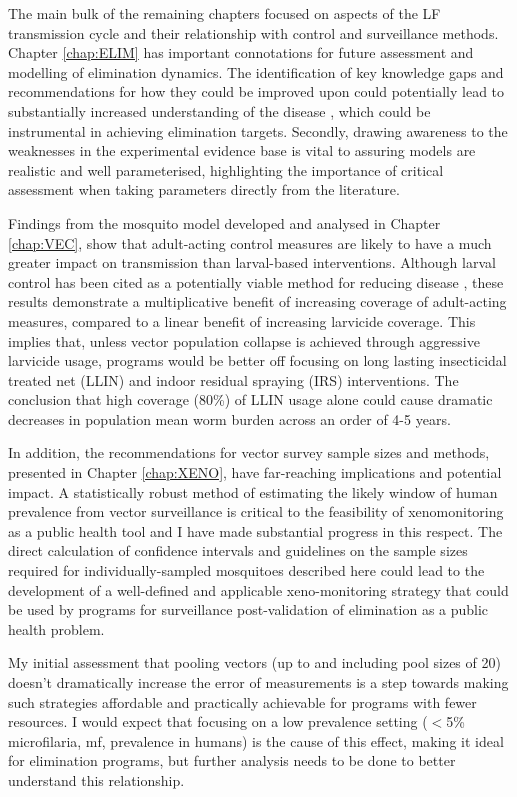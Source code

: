 The main bulk of the remaining chapters focused on aspects of the LF transmission cycle and their relationship with control and surveillance methods. Chapter \ref{chap:ELIM} has important connotations for future assessment and modelling of elimination dynamics. The identification of key knowledge gaps and recommendations for how they could be improved upon could potentially lead to substantially increased understanding of the disease \cite{Davis2019}, which could be instrumental in achieving elimination targets. Secondly, drawing awareness to the weaknesses in the experimental evidence base is vital to assuring models are realistic and well parameterised, highlighting the importance of critical assessment when taking parameters directly from the literature.

Findings from the mosquito model developed and analysed in Chapter \ref{chap:VEC}, show that adult-acting control measures are likely to have a much greater impact on transmission than larval-based interventions. Although larval control has been cited as a potentially viable method for reducing disease \cite{Kroeger1995}, these results demonstrate a multiplicative benefit of increasing coverage of adult-acting measures, compared to a linear benefit of increasing larvicide coverage. This implies that, unless vector population collapse is achieved through aggressive larvicide usage, programs would be better off focusing on long lasting insecticidal treated net (LLIN) and indoor residual spraying (IRS) interventions. The conclusion that high coverage (80\%) of LLIN usage alone could cause dramatic decreases in population mean worm burden across an order of 4-5 years. 

In addition, the recommendations for vector survey sample sizes and methods, presented in Chapter \ref{chap:XENO}, have far-reaching implications and potential impact. A statistically robust method of estimating the likely window of human prevalence from vector surveillance is critical to the feasibility of xenomonitoring as a public health tool and I have made substantial progress in this respect. The direct calculation of confidence intervals and guidelines on the sample sizes required for individually-sampled mosquitoes described here could lead to the development of a well-defined and applicable xeno-monitoring strategy that could be used by programs for surveillance post-validation of elimination as a public health problem.

My initial assessment that pooling vectors (up to and including pool sizes of 20) doesn't dramatically increase the error of measurements is a step towards making such strategies affordable and practically achievable for programs with fewer resources. I would expect that focusing on a low prevalence setting ($<$5\% microfilaria, mf, prevalence in humans) is the cause of this effect, making it ideal for elimination programs, but further analysis needs to be done to better understand this relationship.

